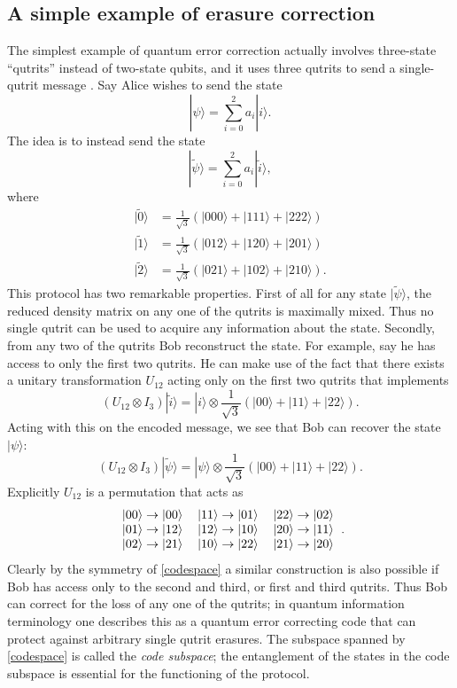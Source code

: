 \documentclass[12pt]{article}
\newcommand{\be}{\begin{equation}}
\newcommand{\ee}{\end{equation}}
\newcommand{\ran}{\rangle}
\newcommand{\wt}{\widetilde}
\begin{document}
\subsection{A simple example of erasure correction}\label{examplesec}
The simplest example of quantum error correction actually involves three-state ``qutrits'' instead of two-state qubits, and it uses three qutrits to send a single-qutrit message \cite{Cleve:1999qg}.  Say Alice wishes to send the state
\be
|\psi\ran=\sum_{i=0}^2 a_i |i\ran.  
\ee
The idea is to instead send the state
\be
|\wt{\psi}\ran=\sum_{i=0}^2 a_i |\wt{i}\ran,
\ee
where
\begin{align}\nonumber
|\wt{0}\ran&=\frac{1}{\sqrt{3}}\left(|000\ran+|111\ran+|222\ran\right)\\\label{codespace}
|\wt{1}\ran&=\frac{1}{\sqrt{3}}\left(|012\ran+|120\ran+|201\ran\right)\\\nonumber
|\wt{2}\ran&=\frac{1}{\sqrt{3}}\left(|021\ran+|102\ran+|210\ran\right).
\end{align} 
This protocol has two remarkable properties.  First of all for any state $|\wt{\psi}\ran$, the reduced density matrix on any one of the qutrits is maximally mixed.  Thus no single qutrit can be used to acquire any information about the state.  Secondly, from any two of the qutrits Bob  reconstruct the state.  For example, say he has access to only the first two qutrits.  He can make use of the fact that there exists a unitary transformation $U_{12}$ acting only on the first two qutrits that implements 
\be\label{U12}
\left(U_{12}\otimes I_3\right)|\wt{i}\ran=|i\ran\otimes \frac{1}{\sqrt{3}}\left(|00\ran+|11\ran+|22\ran\right).
\ee
Acting with this on the encoded message, we see that Bob can recover the state $|\psi\ran$: 
\be
\left(U_{12}\otimes I_3\right)|\wt{\psi}\ran=|\psi\ran\otimes \frac{1}{\sqrt{3}}\left(|00\ran+|11\ran+|22\ran\right).
\ee
Explicitly $U_{12}$ is a permutation that acts as
\be
\begin{tabular}{ l c r }
$|00\ran\to|00\ran$ & $|11\ran \to |01\ran$ & $|22\ran\to |02\ran$ \\
$|01\ran \to |12\ran$ & $|12\ran \to |10\ran$ & $|20\ran \to |11\ran$ \\
$|02\ran\to |21\ran$ & $|10\ran\to|22\ran$ & $|21\ran \to |20\ran$ \\
\end{tabular}.
\ee
Clearly by the symmetry of \eqref{codespace} a similar construction is also possible if Bob has access only to the second and third, or first and third qutrits.  Thus Bob can correct for the loss of any one of the qutrits; in quantum information terminology one describes this as a quantum error correcting code that can protect against arbitrary single qutrit erasures.  The subspace spanned by \eqref{codespace} is called the \textit{code subspace}; the entanglement of the states in the code subspace is essential for the functioning of the protocol.
\end{document}
